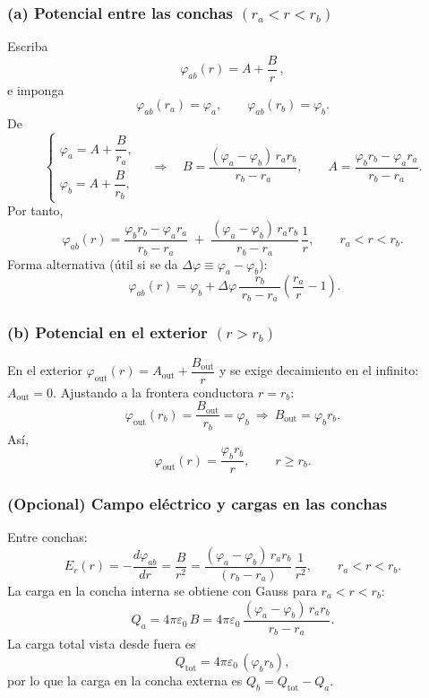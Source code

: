 \documentclass{article}
\begin{document}
\subsubsection*{(a) Potencial entre las conchas \texorpdfstring{$(r_a<r<r_b)$}{(ra<r<rb)}}
Escriba
\[
\varphi_{ab}(r)=A+\frac{B}{r}\,,
\]
e imponga
\[
\varphi_{ab}(r_a)=\varphi_a,\qquad \varphi_{ab}(r_b)=\varphi_b.
\]
De
\[
\begin{cases}
\varphi_a=A+\dfrac{B}{r_a},\\[6pt]
\varphi_b=A+\dfrac{B}{r_b},
\end{cases}
\quad\Longrightarrow\quad
B=\dfrac{(\varphi_a-\varphi_b)\,r_a r_b}{\,r_b-r_a\,},\qquad
A=\dfrac{\varphi_b r_b-\varphi_a r_a}{\,r_b-r_a\,}.
\]
Por tanto,
\[
\boxed{\;
\varphi_{ab}(r)=\frac{\varphi_b r_b-\varphi_a r_a}{\,r_b-r_a\,}
\;+\;\frac{(\varphi_a-\varphi_b)\,r_a r_b}{\,r_b-r_a\,}\,\frac{1}{r},
\qquad r_a<r<r_b.\;}
\]
Forma alternativa (útil si se da $\Delta\varphi\equiv\varphi_a-\varphi_b$):
\[
\boxed{\;
\varphi_{ab}(r)=\varphi_b+\Delta\varphi\,
\frac{r_b}{\,r_b-r_a\,}\left(\frac{r_a}{r}-1\right).}
\]

\subsubsection*{(b) Potencial en el exterior \texorpdfstring{$(r>r_b)$}{(r>rb)}}
En el exterior $\varphi_{\text{out}}(r)=A_{\text{out}}+\dfrac{B_{\text{out}}}{r}$ y se exige decaimiento en el infinito: $A_{\text{out}}=0$. Ajustando a la frontera conductora $r=r_b$:
\[
\varphi_{\text{out}}(r_b)=\frac{B_{\text{out}}}{r_b}=\varphi_b\ \Longrightarrow\ B_{\text{out}}=\varphi_b r_b.
\]
Así,
\[
\boxed{\;
\varphi_{\text{out}}(r)=\frac{\varphi_b r_b}{r},\qquad r\ge r_b.\;}
\]

\subsubsection*{(Opcional) Campo eléctrico y cargas en las conchas}
Entre conchas:
\[
E_r(r)=-\frac{d\varphi_{ab}}{dr}=\frac{B}{r^{2}}
=\frac{(\varphi_a-\varphi_b)\,r_a r_b}{(r_b-r_a)}\,\frac{1}{r^{2}},\qquad r_a<r<r_b.
\]
La carga en la concha interna se obtiene con Gauss para $r_a<r<r_b$:
\[
Q_a=4\pi\varepsilon_0\,B
=4\pi\varepsilon_0\,\frac{(\varphi_a-\varphi_b)\,r_a r_b}{\,r_b-r_a\,}.
\]
La carga total vista desde fuera es
\[
Q_{\text{tot}}=4\pi\varepsilon_0\,(\varphi_b r_b),
\]
por lo que la carga en la concha externa es $Q_b=Q_{\text{tot}}-Q_a$.
\end{document}
